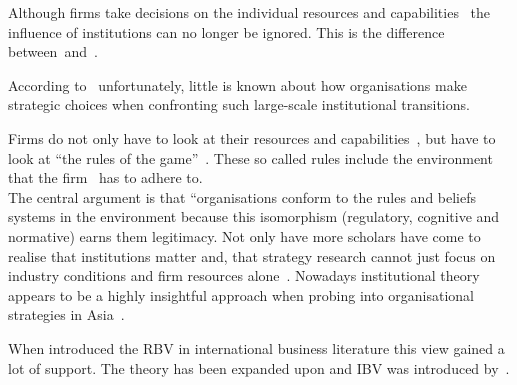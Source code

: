 Although firms take decisions on the individual resources and capabilities~\cite{Barney:1991} the influence of institutions can no longer be ignored. This is the difference between~\rbv and~\ibv. 



According to~\cite{Peng:2003} unfortunately, little is known about how organisations make strategic choices when confronting such large-scale institutional transitions.


 Firms do not only have to look at their resources and capabilities~\cite{Barney:1991}, but have to look at ``the rules of the game''~\cite{Scott:1995}. These so called rules include the environment that the firm \mne~has to adhere to.\\

The central argument is that “organisations conform to the rules and beliefs systems in the environment because this isomorphism (regulatory, cognitive and normative) earns them legitimacy.
Not only have more scholars have come to realise that institutions matter and, that strategy research cannot just focus on industry conditions and firm resources alone~\cite{Powell:1991,Scott:1995}.
Nowadays institutional theory appears to be a highly insightful approach when probing into organisational strategies in Asia~\cite{Hoskisson:2000}.

When introduced the \gls{RBV} in international business literature this view gained a lot of support. 
The theory has been expanded upon and \gls{IBV} was introduced by~\cite{Kostova:1999,Meyer:2009,Wang:2012}.




